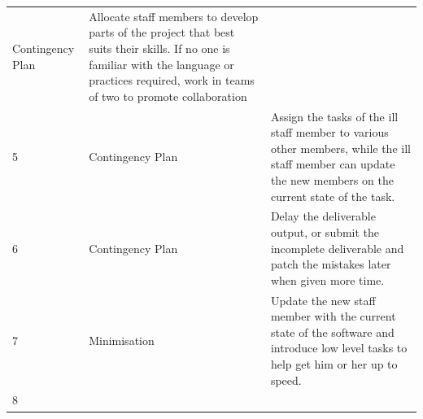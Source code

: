 \documentclass[]{article}
\begin{document}
\begin{longtable}[c]{@{}lll@{}}
\begin{minipage}[t]{0.30\columnwidth}
Contingency Plan
\end{minipage} & \begin{minipage}[t]{0.30\columnwidth}\raggedright
Allocate staff members to develop parts of the project that best suits
their skills. If no one is familiar with the language or practices
required, work in teams of two to promote collaboration
\end{minipage}
\\\addlinespace
\begin{minipage}[t]{0.30\columnwidth}\raggedright
5
\end{minipage} & \begin{minipage}[t]{0.30\columnwidth}\raggedright
Contingency Plan
\end{minipage} & \begin{minipage}[t]{0.30\columnwidth}\raggedright
Assign the tasks of the ill staff member to various other members, while
the ill staff member can update the new members on the current state of
the task.
\end{minipage}
\\\addlinespace
\begin{minipage}[t]{0.30\columnwidth}\raggedright
6
\end{minipage} & \begin{minipage}[t]{0.30\columnwidth}\raggedright
Contingency Plan
\end{minipage} & \begin{minipage}[t]{0.30\columnwidth}\raggedright
Delay the deliverable output, or submit the incomplete deliverable and
patch the mistakes later when given more time.
\end{minipage}
\\\addlinespace
\begin{minipage}[t]{0.30\columnwidth}\raggedright
7
\end{minipage} & \begin{minipage}[t]{0.30\columnwidth}\raggedright
Minimisation
\end{minipage} & \begin{minipage}[t]{0.30\columnwidth}\raggedright
Update the new staff member with the current state of the software and
introduce low level tasks to help get him or her up to speed.
\end{minipage}
\\\addlinespace
\begin{minipage}[t]{0.30\columnwidth}\raggedright
8
\end{minipage} & \begin{minipage}[t]{0.30\columnwidth}\raggedright

\end{minipage}
\end{longtable}
\end{document}

